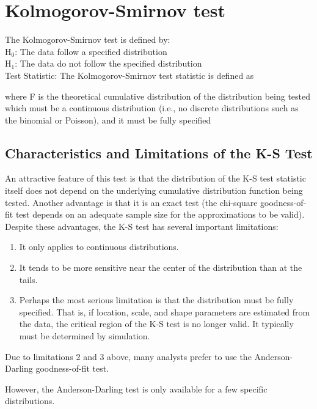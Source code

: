 \documentclass[a4paper,12pt]{article}
\begin{document}

\section{Kolmogorov-Smirnov test}
 The Kolmogorov-Smirnov test is defined by:
\\
H$_0$:     The data follow a specified distribution\\
H$_1$:     The data do not follow the specified distribution\\

Test Statistic:     The Kolmogorov-Smirnov test statistic is defined as

where F is the theoretical cumulative distribution of the distribution being tested which must be a continuous distribution (i.e., no discrete distributions such as the binomial or Poisson), and it must be fully specified

\subsection{ Characteristics and Limitations of the K-S Test}


An attractive feature of this test is that the distribution of the K-S test statistic itself does not depend on the underlying cumulative distribution function being tested. Another advantage is that it is an exact test (the chi-square goodness-of-fit test depends on an adequate sample size for the approximations to be valid). Despite these advantages, the K-S test has several important limitations:
\begin{enumerate}
\item It only applies to continuous distributions.
\item It tends to be more sensitive near the center of the distribution than at the tails.
\item Perhaps the most serious limitation is that the distribution must be fully specified. That is, if location, scale, and shape parameters are estimated from the data, the critical region of the K-S test is no longer valid. It typically must be determined by simulation.
\end{enumerate}
Due to limitations 2 and 3 above, many analysts prefer to use the Anderson-Darling goodness-of-fit test.

However, the Anderson-Darling test is only available for a few specific distributions.
\end{document}
